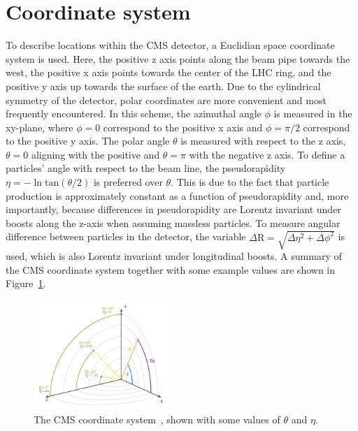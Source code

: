 \section{Coordinate system}
To describe locations within the CMS detector, a Euclidian space coordinate system is used. Here, the positive z axis points along the beam pipe towards the west, the positive x axis points towards the center of the LHC ring, and the positive y axis up towards the surface of the earth. Due to the cylindrical symmetry of the detector, polar coordinates are more convenient and most frequently encountered. In this scheme, the azimuthal angle $\phi$ is measured in the xy-plane, where $\phi=0$ correspond to the positive x axis and $\phi=\pi/2$ correspond to the positive y axis. The polar angle $\theta$ is measured with respect to the z axis, $\theta=0$ aligning with the positive and $\theta=\pi$ with the negative z axis. To define a particles' angle with respect to the beam line, the pseudorapidity $\eta = -\ln{}\textrm{tan}(\theta/2)$ is preferred over $\theta$. This is due to the fact that particle production is approximately constant as a function of pseudorapidity and, more importantly, because differences in pseudorapidity are Lorentz invariant under boosts along the z-axis when assuming massless particles.
To measure angular difference between particles in the detector, the variable $\Delta \textrm{R}=\sqrt{\Delta \eta^2+\Delta \phi^2}$ is used, which is also Lorentz invariant under longitudinal boosts. A summary of the CMS coordinate system together with some example values are shown in Figure~\ref{fig:cms:coordinates}.
\begin{figure}[h] 
    \centering
    \includegraphics[width=0.45\textwidth]{figures/cms/img_cms_coordinates.png}
    \caption{The CMS coordinate system~\cite{Lenzi:2013xpa}, shown with some values of $\theta$ and $\eta$.}
    \label{fig:cms:coordinates}
\end{figure}

